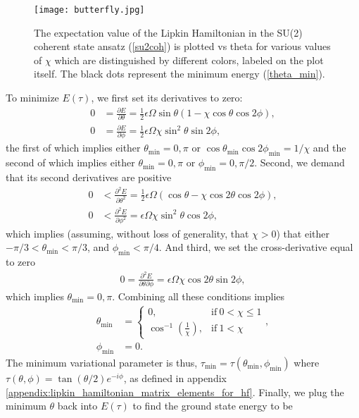 \documentclass[10pt]{article}
\begin{document}
\begin{figure}
    \centering
    \texttt{[image: butterfly.jpg]}
    \caption{The expectation value of the Lipkin Hamiltonian in the SU(2) coherent state ansatz (\ref{su2coh}) is plotted vs theta for various values of $\chi$ which are distinguished by different colors, labeled on the plot itself. The black dots represent the minimum energy (\ref{theta_min}).}
    \label{fig:butterfly}
\end{figure}
To minimize $E(\tau)$, we first set its derivatives to zero:
\begin{align}
0
&=
\frac{\partial E}{\partial\theta}
=
\frac{1}{2}\epsilon\Omega\sin\theta(1-\chi\cos\theta\cos2\phi),
\\
0
&=
\frac{\partial E}{\partial\phi}
=
\frac{1}{2}\epsilon\Omega\chi\sin^2\theta\sin2\phi,
\end{align}
the first of which implies either $\theta_{\text{min}}=0,\pi$ or $\cos\theta_{\text{min}}\cos2\phi_{\text{min}}=1/\chi$ and the second of which implies either $\theta_{\text{min}}=0,\pi$ or $\phi_{\text{min}}=0,\pi/2$. Second, we demand that its second derivatives are positive
\begin{align}
0
&<
\frac{\partial^2E}{\partial\theta^2}
=\frac{1}{2}\epsilon\Omega(\cos\theta-\chi\cos2\theta\cos2\phi),
\\
0
&<
\frac{\partial^2E}{\partial\phi^2}
=
\epsilon\Omega\chi\sin^2\theta\cos2\phi
,\end{align}
which implies (assuming, without loss of generality, that $\chi>0$) that either $-\pi/3<\theta_{\text{min}}<\pi/3$, and $\phi_{\text{min}}<\pi/4$.
And third, we set the cross-derivative equal to zero
\begin{align}
0
=
\frac{\partial^2E}{\partial\theta\partial\phi}
=
\epsilon\Omega\chi\cos2\theta\sin2\phi
,\end{align}
which implies $\theta_{\text{min}}=0,\pi$. Combining all these conditions implies 
\begin{align}
\label{theta_min}
\theta_{\text{min}}
&=
\begin{cases}
0, & \text{if} \ 0<\chi\leq1
\\
\cos^{-1}\left(\frac{1}{\chi}\right), & \text{if} \ 1<\chi
\end{cases},
\\
\phi_{\text{min}}
&=0.
\end{align}
The minimum variational parameter is thus, $\tau_{\text{min}}=\tau(\theta_{\text{min}},\phi_{\text{min}})$ where $\tau(\theta,\phi)=\tan(\theta/2)e^{-i\phi}$, as defined in appendix \ref{appendix:lipkin_hamiltonian_matrix_elements_for_hf}. Finally, we plug the minimum $\theta$ back into $E(\tau)$ to find the ground state energy to be
\end{document}
